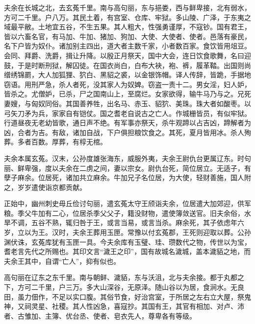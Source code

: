 \documentclass[12pt,UTF8]{ctexbook}
\begin{document}
夫余在长城之北，去玄菟千里。南与高句丽，东与挹娄，西与鲜卑接，北有弱水，方可二千里。户八万。其民土着，有宫室、仓库、牢狱。多山陵、广泽，于东夷之域最平敝。土地宜五谷，不生五果。其人粗大，性强勇谨厚，不寇钞。国有君王，皆以六畜名官，有马加、牛加、猪加、狗加、大使、大使者、使者。邑落有豪民，名下户皆为奴仆。诸加别主四出，道大者主数千家，小者数百家。食饮皆用俎豆。会同、拜爵、洗爵，揖让升降。以殷正月祭天，国中大会，连日饮食歌舞，名曰迎鼓，于是时断刑狱，解囚徒。在国衣尚白，白布大袂，袍、裤，履革鞜。出国则尚缯绣锦罽，大人加狐狸、狖白、黑貂之裘，以金银饰帽。译人传辞，皆跪，手据地窃语。用刑严急，杀人者死，没其家人为奴婢。窃盗一责十二。男女淫，妇人妒，皆杀之。尤僧妒，已杀，尸之国南山上，至腐烂。女家欲得，输牛马乃与之。兄死妻嫂，与匈奴同俗。其国善养牲，出名马、赤玉、貂狖、美珠。珠大者如酸枣。以弓矢刀矛为兵，家家自有铠仗。国之耆老自说古之亡人。作城栅皆员，有似牢狱。行道昼夜无老幼皆歌，通日声不绝。有军事亦祭天，杀牛观蹄以占吉凶，蹄解者为凶，合者为吉。有敌，诸加自战，下户俱担粮饮食之。其死，夏月皆用冰。杀人殉葬。多者百数。厚葬，有椁无棺。

夫余本属玄菟。汉末，公孙度雄张海东，威服外夷，夫余王尉仇台更属辽东。时句丽、鲜卑强，度以夫余在二虏之间，妻以宗女。尉仇台死，简位居立。无适子，有孽子麻余。位居死，诸加共立麻余。牛加兄子名位居，为大使，轻财善施，国人附之，岁岁遣使诣京都贡献。

正始中，幽州刺史毋丘俭讨句丽，遣玄菟太守王颀诣夫余，位居遣大加郊迎，供军粮。季父牛加有二心，位居杀季父父子，籍没财物，遣使簿敛送官。旧夫余俗，水旱不调，五谷不熟，辄归咎于王，或言当易，或言当杀。麻余死，其子依虑年六岁，立以为王。汉时，夫余王葬用玉匣。常豫以付玄菟郡，王死则迎取以葬。公孙渊伏诛，玄菟库犹有玉匣一具。今夫余库有玉璧、珪、瓒数代之物，传世以为宝，耆老言先代之所赐也。其印文言“濊王之印”，国有故城名濊城，盖本濊貊之地，而夫余王其中，自谓“亡人”，抑有似也。

高句丽在辽东之东千里。南与朝鲜、濊貊，东与沃沮，北与夫余接。都于丸都之下，方可二千里，户三万。多大山深谷，无原泽。随山谷以为居，食涧水。无良田，虽力佃作，不足以实口腹。其俗节食，好治宫室，于所居之左右立大屋，祭鬼神，又祠灵星、社稷。其人性凶急，喜寇抄。其国有王，其官有相加、对卢、沛者、古雏加、主簿、优台丞、使者、皂衣先人，尊卑各有等级。
\end{document}
